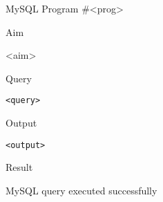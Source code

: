 \documentclass[12pt, a4]{article}
\begin{document}
{\color{turquoise}
\begin{center} {\huge MySQL Program \#<prog>\par } \end{center}
}
\medskip

\hrulefill

\bigskip

{\color{turquoise}\large Aim \par}
\medskip
\begin{adjustwidth}{2cm}{}
	<aim>
\end{adjustwidth}
\bigskip
\medskip

{\color{turquoise}\large Query \par}
\medskip
\begin{adjustwidth}{2cm}{}
	\begin{lstlisting}
<query>
	\end{lstlisting}
\end{adjustwidth}

{\color{turquoise}\large Output \par}
\medskip
{
\begin{center}
\centering
\begin{BVerbatim}
<output>
\end{BVerbatim}
\end{center}
}
\bigskip
\medskip

{\color{turquoise}\large Result \par}
\medskip
\begin{adjustwidth}{2cm}{}
	MySQL query executed successfully
\end{adjustwidth}
\end{document}
